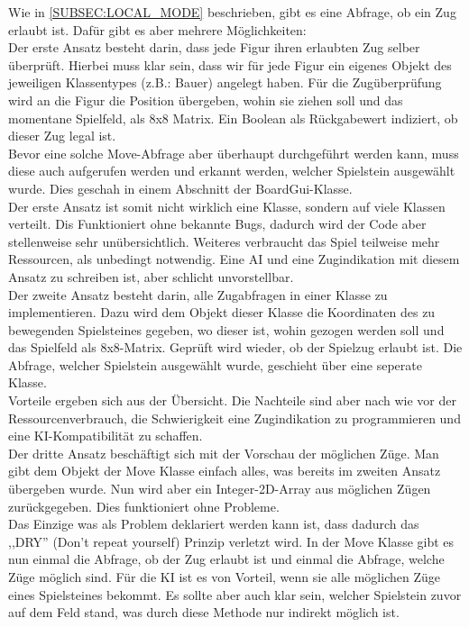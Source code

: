 \documentclass[12pt,a4paper]{article}
\begin{document}
{Wie in \ref{SUBSEC:LOCAL_MODE} beschrieben, gibt es eine Abfrage, ob ein Zug erlaubt ist. Dafür gibt es aber mehrere Möglichkeiten:\\
Der erste Ansatz besteht darin, dass jede Figur ihren erlaubten Zug selber überprüft. Hierbei muss klar sein, dass wir für jede Figur ein eigenes Objekt des jeweiligen Klassentypes (z.B.: Bauer) angelegt haben. Für die Zugüberprüfung wird an die Figur die Position übergeben, wohin sie ziehen soll und das momentane Spielfeld, als 8x8 Matrix. Ein Boolean als Rückgabewert indiziert, ob dieser Zug legal ist. \\
Bevor eine solche Move-Abfrage aber überhaupt durchgeführt werden kann, muss diese auch aufgerufen werden und erkannt werden, welcher Spielstein ausgewählt wurde. Dies geschah in einem Abschnitt der BoardGui-Klasse. \\
Der erste Ansatz ist somit nicht wirklich eine Klasse, sondern auf viele Klassen verteilt. Dis Funktioniert ohne bekannte Bugs, dadurch wird der Code aber stellenweise sehr unübersichtlich. Weiteres verbraucht das Spiel teilweise mehr Ressourcen, als unbedingt notwendig. Eine AI und eine Zugindikation mit diesem Ansatz zu schreiben ist, aber schlicht unvorstellbar. \\[2ex]
Der zweite Ansatz besteht darin, alle Zugabfragen in einer Klasse zu implementieren. Dazu wird dem Objekt dieser Klasse die Koordinaten des zu bewegenden Spielsteines gegeben, wo dieser ist, wohin gezogen werden soll und das Spielfeld als 8x8-Matrix. Geprüft wird wieder, ob der Spielzug erlaubt ist. Die Abfrage, welcher Spielstein ausgewählt wurde, geschieht über eine seperate Klasse.\\ 
Vorteile ergeben sich aus der Übersicht. Die Nachteile sind aber nach wie vor der Ressourcenverbrauch, die Schwierigkeit eine Zugindikation zu programmieren und eine KI-Kompatibilität zu schaffen.\\[2ex]
Der dritte Ansatz beschäftigt sich mit der Vorschau der möglichen Züge. Man gibt dem Objekt der Move Klasse einfach alles, was bereits im zweiten Ansatz übergeben wurde. Nun wird aber ein Integer-2D-Array aus möglichen Zügen zurückgegeben. Dies funktioniert ohne Probleme. \\
Das Einzige was als Problem deklariert werden kann ist, dass dadurch das ,,DRY'' (Don't repeat yourself) Prinzip verletzt wird. In der Move Klasse gibt es nun einmal die Abfrage, ob der Zug erlaubt ist und einmal die Abfrage, welche Züge möglich sind. Für die KI ist es von Vorteil, wenn sie alle möglichen Züge eines Spielsteines bekommt. Es sollte aber auch klar sein, welcher Spielstein zuvor auf dem Feld stand, was durch diese Methode nur indirekt möglich ist. \\[2ex]
}
\end{document}
